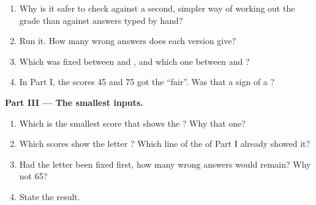 \begin{problem}
\label{lst:g7:finding-and-fixing-bugs:check}

\begin{enumerate}[resume]
  \item Why is it safer to check against a second, simpler way of working out
    the grade than against answers typed by hand?
  \item Run it. How many wrong answers does each version give?
  \item Which  was fixed between  and , and
    which one between  and ?
  \item In Part I, the scores 45 and 75 got the  ``fair''. Was that
    a sign of a ?
\end{enumerate}

\medskip\noindent\textbf{Part III --- The smallest inputs.}
\begin{enumerate}[resume]
  \item Which is the smallest score that shows the  ? Why that
    one?
  \item Which scores show the letter ? Which line of the  of Part I
    already showed it?
  \item Had the letter  been fixed first, how many wrong answers would
    remain? Why not 65?
  \item State the result.
\end{enumerate}
\end{problem}

